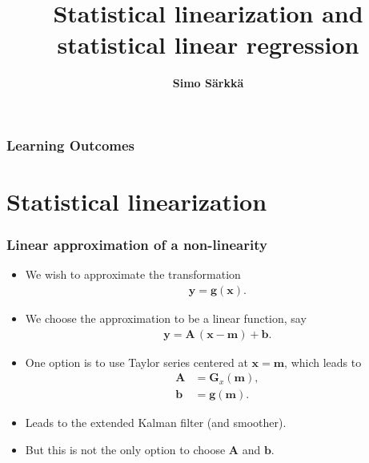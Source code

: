 \documentclass[first=dgreen,second=purple,presentation]{elecslides}
\title{Statistical linearization and statistical linear regression}
\author{{\bf Simo S\"arkk\"a}}
\institute{Aalto University, Finland}
\date{}
\newcommand{\mbf}[1]{\mathbf{#1}}
\newcommand{\vb}{\mbf{b}}
\newcommand{\vg}{\mbf{g}}
\newcommand{\vm}{\mbf{m}}
\newcommand{\vx}{\mbf{x}}
\newcommand{\vy}{\mbf{y}}
\newcommand{\MA}{\mbf{A}}
\newcommand{\MG}{\mbf{G}}
\begin{document}

\aaltotitleframe

\begin{frame}
  \frametitle{Learning Outcomes}
  \tableofcontents[pausesections]
\end{frame}


\section{Statistical linearization}

\begin{frame}
 \frametitle{Linear approximation of a non-linearity}

\begin{itemize}[<+->]
\item We wish to approximate the \alert{transformation}
%
\begin{equation}
\begin{split}
  \vy = \vg(\vx).
\end{split}
\nonumber
\end{equation}

\item We choose the approximation to be a \alert{linear function}, say
%
\begin{equation}
\begin{split}
  \vy = \MA \, (\vx - \vm) + \vb.
\end{split}
\nonumber
\end{equation}

\item One option is to use \alert{Taylor series} centered at $\vx = \vm$, which leads to
%
\begin{equation}
\begin{split}
  \MA &= \MG_x(\vm), \\
  \vb &= \vg(\vm).
\end{split}
\nonumber
\end{equation}
%
\item Leads to the \alert{extended Kalman filter} (and smoother).

\item But this is \alert{not the only option} to choose $\MA$ and $\vb$.
\end{itemize}
\end{frame}
\end{document}
